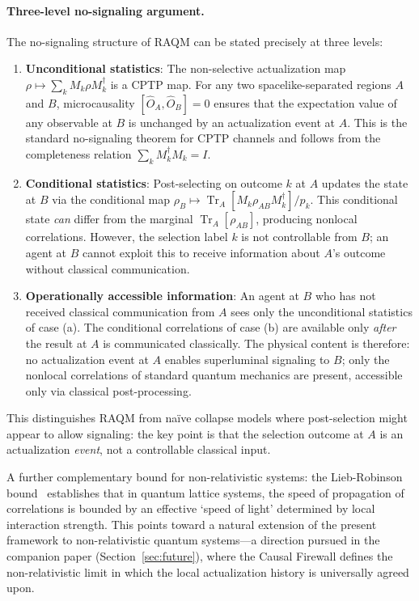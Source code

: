 \documentclass[11pt,a4paper]{article}
\theoremstyle{plain}
\theoremstyle{definition}
\theoremstyle{remark}
\begin{document}
\paragraph{Three-level no-signaling argument.}
The no-signaling structure of RAQM can be stated precisely at three levels:
\begin{enumerate}[noitemsep,label=(\alph*)]
\item \textbf{Unconditional statistics}: The non-selective actualization map
$\rho \mapsto \sum_k M_k \rho M_k^\dagger$ is a CPTP map. For any two
spacelike-separated regions $A$ and $B$, microcausality
$[\hat{O}_A, \hat{O}_B] = 0$ ensures that the expectation value of any
observable at $B$ is unchanged by an actualization event at $A$. This is
the standard no-signaling theorem for CPTP channels and follows from
the completeness relation $\sum_k M_k^\dagger M_k = I$.
\item \textbf{Conditional statistics}: Post-selecting on outcome $k$ at $A$
updates the state at $B$ via the conditional map
$\rho_B \mapsto \operatorname{Tr}_A[M_k \rho_{AB} M_k^\dagger]/p_k$.
This conditional state \emph{can} differ from the marginal
$\operatorname{Tr}_A[\rho_{AB}]$, producing nonlocal correlations.
However, the selection label $k$ is not controllable from $B$; an agent
at $B$ cannot exploit this to receive information about $A$'s outcome
without classical communication.
\item \textbf{Operationally accessible information}: An agent at $B$ who
has not received classical communication from $A$ sees only the
unconditional statistics of case (a). The conditional correlations of
case (b) are available only \emph{after} the result at $A$ is
communicated classically. The physical content is therefore: no
actualization event at $A$ enables superluminal signaling to $B$;
only the nonlocal correlations of standard quantum mechanics are present,
accessible only via classical post-processing.
\end{enumerate}
This distinguishes RAQM from na\"{i}ve collapse models where post-selection
might appear to allow signaling: the key point is that the selection outcome
at $A$ is an actualization \emph{event}, not a controllable classical input.

A further complementary bound for non-relativistic systems: the Lieb-Robinson
bound~\citep{LiebRobinson1972} establishes that in quantum lattice systems, the
speed of propagation of correlations is bounded by an effective `speed of light'
determined by local interaction strength. This points toward a natural extension of
the present framework to non-relativistic quantum systems---a direction pursued in
the companion paper (Section~\ref{sec:future}), where the Causal Firewall defines
the non-relativistic limit in which the local actualization history is universally
agreed upon.
\end{document}
